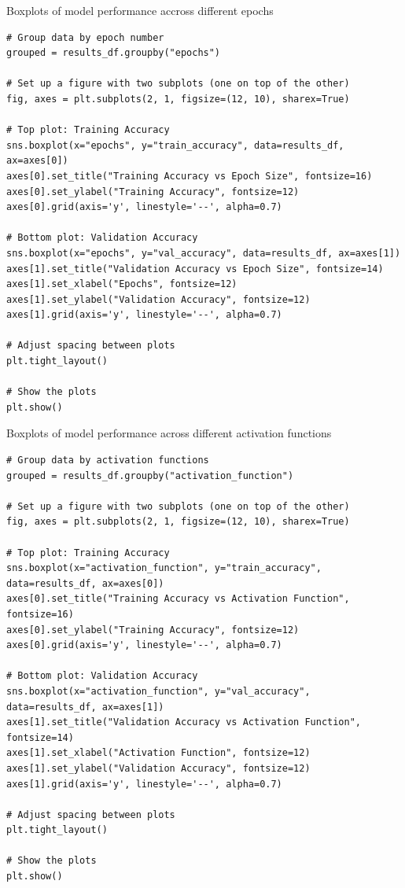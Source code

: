 \documentclass[a4paper]{article}
\begin{document}
Boxplots of model performance accross different epochs
\begin{lstlisting}
# Group data by epoch number
grouped = results_df.groupby("epochs")

# Set up a figure with two subplots (one on top of the other)
fig, axes = plt.subplots(2, 1, figsize=(12, 10), sharex=True)

# Top plot: Training Accuracy
sns.boxplot(x="epochs", y="train_accuracy", data=results_df, ax=axes[0])
axes[0].set_title("Training Accuracy vs Epoch Size", fontsize=16)
axes[0].set_ylabel("Training Accuracy", fontsize=12)
axes[0].grid(axis='y', linestyle='--', alpha=0.7)

# Bottom plot: Validation Accuracy
sns.boxplot(x="epochs", y="val_accuracy", data=results_df, ax=axes[1])
axes[1].set_title("Validation Accuracy vs Epoch Size", fontsize=14)
axes[1].set_xlabel("Epochs", fontsize=12)
axes[1].set_ylabel("Validation Accuracy", fontsize=12)
axes[1].grid(axis='y', linestyle='--', alpha=0.7)

# Adjust spacing between plots
plt.tight_layout()

# Show the plots
plt.show()
\end{lstlisting}


Boxplots of model performance across different activation functions
\begin{lstlisting}
# Group data by activation functions
grouped = results_df.groupby("activation_function")

# Set up a figure with two subplots (one on top of the other)
fig, axes = plt.subplots(2, 1, figsize=(12, 10), sharex=True)

# Top plot: Training Accuracy
sns.boxplot(x="activation_function", y="train_accuracy", data=results_df, ax=axes[0])
axes[0].set_title("Training Accuracy vs Activation Function", fontsize=16)
axes[0].set_ylabel("Training Accuracy", fontsize=12)
axes[0].grid(axis='y', linestyle='--', alpha=0.7)

# Bottom plot: Validation Accuracy
sns.boxplot(x="activation_function", y="val_accuracy", data=results_df, ax=axes[1])
axes[1].set_title("Validation Accuracy vs Activation Function", fontsize=14)
axes[1].set_xlabel("Activation Function", fontsize=12)
axes[1].set_ylabel("Validation Accuracy", fontsize=12)
axes[1].grid(axis='y', linestyle='--', alpha=0.7)

# Adjust spacing between plots
plt.tight_layout()

# Show the plots
plt.show()
\end{lstlisting}
\end{document}
